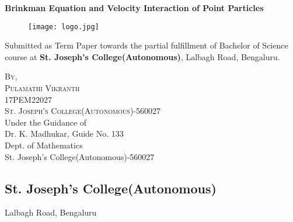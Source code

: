 \documentclass[12pt]{article}
\begin{document}
\begin{titlepage}
  \begin{center}
  \huge{\bfseries Brinkman Equation and Velocity Interaction of Point Particles}\\
  \end{center}
 
  \begin{figure}
  \centering
  \texttt{[image: logo.jpg]} %
  \end{figure}
  
  \vspace{5mm}
  \begin{center}
  Submitted as Term Paper towards the partial fulfillment of Bachelor of Science course at \textbf{St. Joseph's College(Autonomous)}, Lalbagh Road, Bengaluru.
  \end{center}

  
  \vspace{20mm}
  \begin{center}
  \textsc{By,\\ Pulamathi Vikranth\\ 17PEM22027\\ St. Joseph's College(Autonomous)-560027}\\
  \vspace{20mm}
  Under the Guidance of\\
  Dr. K. Madhukar, Guide No. 133\\
  Dept. of Mathematics\\
  St. Joseph's College(Autonomous)-560027
  \end{center}
 


\end{titlepage}

\cleardoublepage


\begin{center}
\section*{St. Joseph's College(Autonomous)}
\begin{center}
Lalbagh Road, Bengaluru
\end{center}
\end{center}
\end{document}
